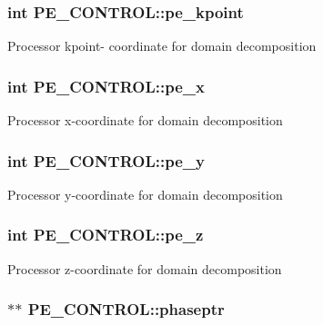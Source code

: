 \hypertarget{struct_p_e___c_o_n_t_r_o_l_a7b1fdf2894086cbfb7cf6bb8a2fc95b1}{
\subsubsection[{pe\-\_\-kpoint}]{\setlength{\rightskip}{0pt plus 5cm}int P\-E\-\_\-\-C\-O\-N\-T\-R\-O\-L\-::pe\-\_\-kpoint}}\label{struct_p_e___c_o_n_t_r_o_l_a7b1fdf2894086cbfb7cf6bb8a2fc95b1}
Processor kpoint-\/ coordinate for domain decomposition \hypertarget{struct_p_e___c_o_n_t_r_o_l_a5fbb8e8bb5713a4b50310e177443cb91}{
\subsubsection[{pe\-\_\-x}]{\setlength{\rightskip}{0pt plus 5cm}int P\-E\-\_\-\-C\-O\-N\-T\-R\-O\-L\-::pe\-\_\-x}}\label{struct_p_e___c_o_n_t_r_o_l_a5fbb8e8bb5713a4b50310e177443cb91}
Processor x-\/coordinate for domain decomposition \hypertarget{struct_p_e___c_o_n_t_r_o_l_a8e1af9bd70d68465b13a5daf35629627}{
\subsubsection[{pe\-\_\-y}]{\setlength{\rightskip}{0pt plus 5cm}int P\-E\-\_\-\-C\-O\-N\-T\-R\-O\-L\-::pe\-\_\-y}}\label{struct_p_e___c_o_n_t_r_o_l_a8e1af9bd70d68465b13a5daf35629627}
Processor y-\/coordinate for domain decomposition \hypertarget{struct_p_e___c_o_n_t_r_o_l_a12bd2f2434766c0b5bf2bf5d0823dde7}{
\subsubsection[{pe\-\_\-z}]{\setlength{\rightskip}{0pt plus 5cm}int P\-E\-\_\-\-C\-O\-N\-T\-R\-O\-L\-::pe\-\_\-z}}\label{struct_p_e___c_o_n_t_r_o_l_a12bd2f2434766c0b5bf2bf5d0823dde7}
Processor z-\/coordinate for domain decomposition \hypertarget{struct_p_e___c_o_n_t_r_o_l_a064677de6660e1990efa7b865a86d091}{
\subsubsection[{phaseptr}]{$\ast$$\ast$ P\-E\-\_\-\-C\-O\-N\-T\-R\-O\-L\-::phaseptr}}\label{struct_p_e___c_o_n_t_r_o_l_a064677de6660e1990efa7b865a86d091}
